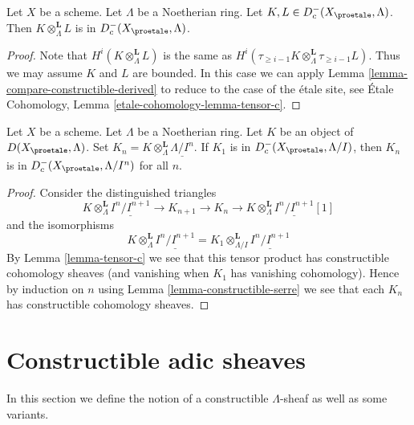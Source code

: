 \begin{lemma}
\label{lemma-tensor-c}
Let $X$ be a scheme. Let $\Lambda$ be a Noetherian ring.
Let $K, L \in D_c^-(X_\proetale, \Lambda)$. Then
$K \otimes_\Lambda^\mathbf{L} L$ is in $D_c^-(X_\proetale, \Lambda)$.
\end{lemma}

\begin{proof}
Note that $H^i(K \otimes_\Lambda^\mathbf{L} L)$ is the same as
$H^i(\tau_{\geq i - 1}K \otimes_\Lambda^\mathbf{L} \tau_{\geq i - 1}L)$.
Thus we may assume $K$ and $L$ are bounded.
In this case we can apply Lemma \ref{lemma-compare-constructible-derived} to
reduce to the case of the \'etale site, see
\'Etale Cohomology, Lemma \ref{etale-cohomology-lemma-tensor-c}.
\end{proof}

\begin{lemma}
\label{lemma-compare-truncations-constructible}
Let $X$ be a scheme. Let $\Lambda$ be a Noetherian ring.
Let $K$ be an object of $D(X_\proetale, \Lambda)$.
Set $K_n = K \otimes_\Lambda^\mathbf{L} \underline{\Lambda/I^n}$.
If $K_1$ is in $D^-_c(X_\proetale, \Lambda/I)$, then
$K_n$ is in $D^-_c(X_\proetale, \Lambda/I^n)$ for all $n$.
\end{lemma}

\begin{proof}
Consider the distinguished triangles
$$
K \otimes_\Lambda^\mathbf{L} \underline{I^n/I^{n + 1}} \to
K_{n + 1} \to
K_n \to
K \otimes_\Lambda^\mathbf{L} \underline{I^n/I^{n + 1}}[1]
$$
and the isomorphisms
$$
K \otimes_\Lambda^\mathbf{L} \underline{I^n/I^{n + 1}} =
K_1 \otimes_{\Lambda/I}^\mathbf{L} \underline{I^n/I^{n + 1}}
$$
By Lemma \ref{lemma-tensor-c} we see that this tensor product has
constructible cohomology sheaves (and vanishing when $K_1$ has
vanishing cohomology). Hence by induction on $n$ using
Lemma \ref{lemma-constructible-serre}
we see that each $K_n$ has constructible cohomology sheaves.
\end{proof}








\section{Constructible adic sheaves}
\label{section-adic}

\noindent
In this section we define the notion of a constructible
$\Lambda$-sheaf as well as some variants.

